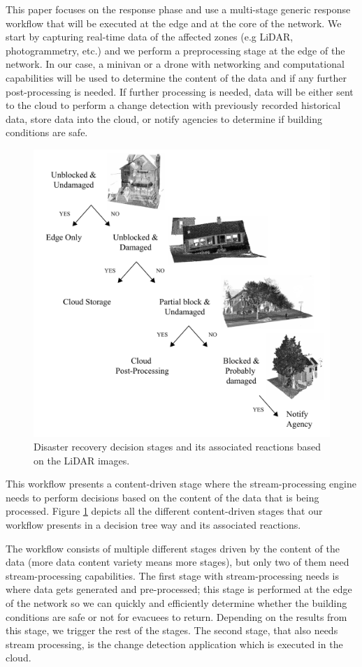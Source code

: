 This paper focuses on the response phase and use a multi-stage generic response workflow that will be executed at the edge and at the core of the network. We start by capturing real-time data of the affected zones (e.g LiDAR, photogrammetry, etc.) and we perform a preprocessing stage at the edge of the network. In our case, a minivan or a drone with networking and computational capabilities will be used to determine the content of the data and if any further post-processing is needed. If further processing is needed, data will be either sent to the cloud to perform a change detection with previously recorded historical data, store data into the cloud, or notify agencies to determine if building conditions are safe. 

\begin{figure}[ht]
  \centering
  \includegraphics[width=0.5\linewidth]{Figures/diagonal.pdf}
  \caption{Disaster recovery decision stages and its associated reactions based on the LiDAR images.}
  \label{data_uncertainty}
\end{figure}

This workflow presents a content-driven stage where the stream-processing engine needs to perform decisions based on the content of the data that is being processed. Figure \ref{data_uncertainty} depicts all the different content-driven stages that our workflow presents in a decision tree way and its associated reactions. 

The workflow consists of multiple different stages driven by the content of the data (more data content variety means more stages), but only two of them need stream-processing capabilities. The first stage with stream-processing needs is where data gets generated and pre-processed; this stage is performed at the edge of the network so we can quickly and efficiently determine whether the building conditions are safe or not for evacuees to return. Depending on the results from this stage, we trigger the rest of the stages. The second stage, that also needs stream processing, is the change detection application which is executed in the cloud.

